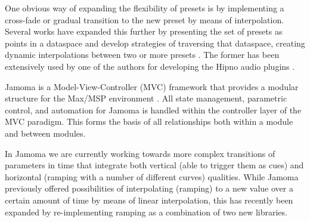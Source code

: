 \documentclass{article}
\begin{document}

One obvious way of expanding the flexibility of presets is by implementing a cross-fade or gradual transition to the new preset by means of interpolation. Several works have expanded this further by presenting the set of presets as points in a dataspace and develop strategies of traversing that dataspace, creating dynamic interpolations between two or more presets \cite{Momeni:2003, Bencina:2005metasurface}. The former has been extensively used by one of the authors for developing the Hipno audio plugins \cite{Place:2005hipno}.


Jamoma is a Model-View-Controller (MVC) framework \cite{Krasner:1988} that provides a modular structure for the Max/MSP environment \cite{Place:2006}. All state management, parametric control, and automation for Jamoma is handled within the controller layer of the MVC paradigm. This forms the basis of all relationships both within a module and between modules.



In Jamoma we are currently working towards more complex transitions of parameters in time that integrate both vertical (able to trigger them as cues) and horizontal (ramping with a number of different curves) qualities. While Jamoma previously offered possibilities of interpolating (ramping) to a new value over a certain amount of time by means of linear interpolation, this has recently been expanded by re-implementing ramping as a combination of two new libraries. 

\end{document}
